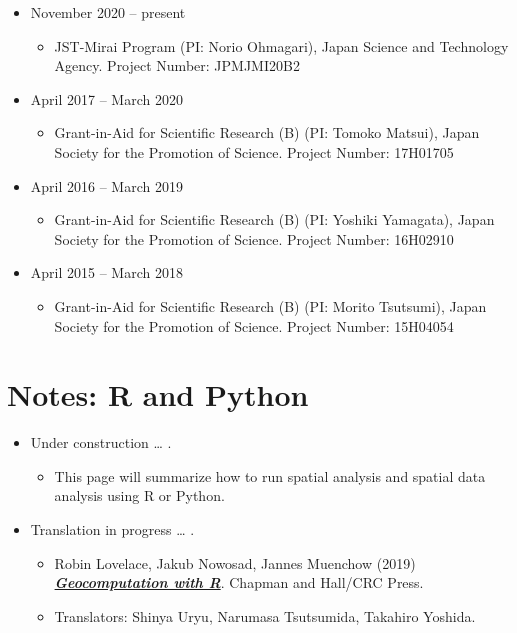 \documentclass[
]{book}
\providecommand{\tightlist}{%
  \setlength{\itemsep}{0pt}\setlength{\parskip}{0pt}}
\begin{document}
\begin{itemize}
\tightlist
\item
  November 2020 -- present

  \begin{itemize}
  \tightlist
  \item
    JST-Mirai Program (PI: Norio Ohmagari),
    Japan Science and Technology Agency.
    Project Number: JPMJMI20B2
  \end{itemize}
\item
  April 2017 -- March 2020

  \begin{itemize}
  \tightlist
  \item
    Grant-in-Aid for Scientific Research (B) (PI: Tomoko Matsui),
    Japan Society for the Promotion of Science.
    Project Number: 17H01705
  \end{itemize}
\item
  April 2016 -- March 2019

  \begin{itemize}
  \tightlist
  \item
    Grant-in-Aid for Scientific Research (B) (PI: Yoshiki Yamagata),
    Japan Society for the Promotion of Science.
    Project Number: 16H02910
  \end{itemize}
\item
  April 2015 -- March 2018

  \begin{itemize}
  \tightlist
  \item
    Grant-in-Aid for Scientific Research (B) (PI: Morito Tsutsumi),
    Japan Society for the Promotion of Science.
    Project Number: 15H04054
  \end{itemize}
\end{itemize}

\hypertarget{notes-r-and-python}{%
\chapter*{Notes: R and Python}\label{notes-r-and-python}}

\begin{itemize}
\tightlist
\item
  Under construction \ldots{} .

  \begin{itemize}
  \tightlist
  \item
    This page will summarize how to run spatial analysis and spatial data analysis using R or Python.
  \end{itemize}
\item
  Translation in progress \ldots{} .

  \begin{itemize}
  \tightlist
  \item
    Robin Lovelace, Jakub Nowosad, Jannes Muenchow (2019) \textbf{\emph{\href{https://geocompr.robinlovelace.net/}{Geocomputation with R}}}. Chapman and Hall/CRC Press.
  \item
    Translators: Shinya Uryu, Narumasa Tsutsumida, Takahiro Yoshida.
  \end{itemize}
\end{itemize}

  
\end{document}
